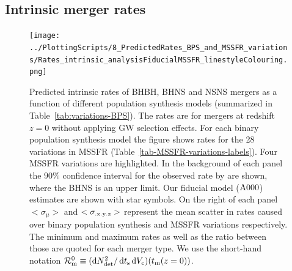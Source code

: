 \documentclass[twocolumn]{aastex63}
\newcommand\rate{\mathcal{R}}
\newcommand\bhnsSingle{BHNS\xspace}
\newcommand{\ts}{\ensuremath{{t}_{\rm{s}}}\xspace}
\newcommand{\tmerger}{\ensuremath{{t}_{\rm{m}}}\xspace}
\newcommand{\Ndet}{\ensuremath{{N}_{\rm{det}}}\xspace}
\newcommand{\Vc}{\ensuremath{{V}_{\rm{c}}}\xspace}
\newcommand*\diff{\mathop{}\!\mathrm{d}}
\newcommand{\mAzero}{\ensuremath{\rm{A}000}\xspace}
\begin{document}
\subsection{Intrinsic merger rates}
\label{subsec:results-variations-rates}
%


\begin{figure}
    \centering
\texttt{[image: ../PlottingScripts/8\_PredictedRates\_BPS\_and\_MSSFR\_variations/Rates\_intrinsic\_analysisFiducialMSSFR\_linestyleColouring.png]} %
    \caption{Predicted intrinsic rates of BHBH, BHNS and NSNS mergers as a function of different population synthesis models (summarized in Table~\ref{tab:variations-BPS}).  
    The rates are for mergers at redshift $z=0$ without applying \ac{GW} selection effects. 
    For each binary population synthesis model the figure shows rates for the 28 variations in \ac{MSSFR} (Table~\ref{tab-MSSFR-variations-labels}). Four \ac{MSSFR} variations are highlighted.  In the background of each panel the  $90\%$ confidence interval for the observed rate by \citep{2019PhRvX...9c1040A,2020arXiv200101761T} are shown, where the \bhnsSingle is an upper limit. Our fiducial model  (\mAzero) estimates are shown with star symbols. On the right of each panel  $<\sigma_{\mu}>$ and $<\sigma_{\rm{.x.y.z}}>$ represent the mean scatter  in  rates caused over binary population synthesis and \ac{MSSFR} variations respectively. The minimum and maximum rates as well as the ratio between those are quoted for each merger type. We use the short-hand notation $\rate_{\rm{m}}^0 \equiv (\diff \Ndet^2 / \diff \ts \diff \Vc)(\tmerger(z=0))$. }%
    \label{fig:IntrinsicRates}
\end{figure}
%
\end{document}
